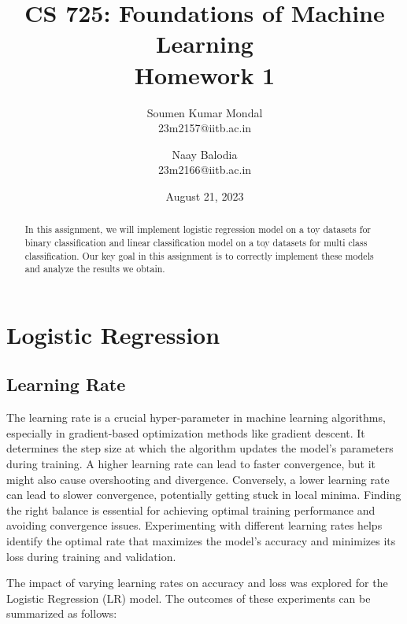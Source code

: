 \documentclass[12pt, a4paper, twoside]{article}
\title{\vspace{-0.5in}\textbf{CS 725: Foundations of Machine Learning \\
Homework 1}}
\author{Soumen Kumar Mondal\\
23m2157@iitb.ac.in \and
Naay Balodia\\
23m2166@iitb.ac.in}
\date{August  21, 2023}
\begin{document}
\maketitle
\thispagestyle{fancy}
\begin{abstract}
In this assignment, we will implement logistic regression model on a toy datasets for binary classification and linear classification model on a toy datasets for multi class classification. Our key goal in this assignment is to correctly implement these models and analyze the results we obtain.
\end{abstract}
		
\section{Logistic Regression}\label{S:LR}
\subsection{Learning Rate}\label{SS:lr-rate}
The learning rate is a crucial hyper-parameter in machine learning algorithms, especially in gradient-based optimization methods like gradient descent. It determines the step size at which the algorithm updates the model's parameters during training. A higher learning rate can lead to faster convergence, but it might also cause overshooting and divergence. Conversely, a lower learning rate can lead to slower convergence, potentially getting stuck in local minima. Finding the right balance is essential for achieving optimal training performance and avoiding convergence issues. Experimenting with different learning rates helps identify the optimal rate that maximizes the model's accuracy and minimizes its loss during training and validation.
\par
The impact of varying learning rates on accuracy and loss was explored for the Logistic Regression (LR) model. The outcomes of these experiments can be summarized as follows:
\end{document}
